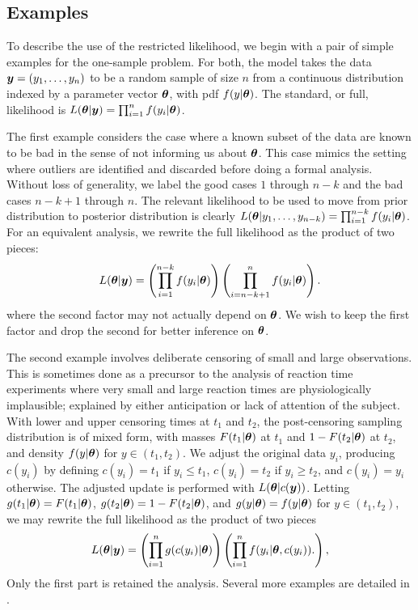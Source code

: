 \documentclass[ba]{imsart}
\def\bth{\mbox{\boldmath $\theta$}}
\newcommand{\by}{\mbox{\boldmath $y$}}
\begin{document}
\subsection{Examples}
To describe the use of the restricted likelihood, 
we begin with a pair of simple examples for the one-sample problem.  For both, the model takes the data $\by=(y_1,\ldots,y_n)$ to be a random sample
of size $n$ from a continuous distribution indexed by a parameter
vector $\bth$, with pdf $f(y| \bth)$.  The standard, or full,
likelihood is $L(\bth | \by) = \prod_{i=1}^n f(y_i | \bth)$.  

The first example considers the case where a known subset of the data are known to be 
bad in the sense of not informing us about $\bth$.  This case mimics the setting where outliers are identified and discarded before doing a formal analysis.  Without loss of generality, we label the good cases $1$ through $n-k$ and the bad cases $n-k+1$ through $n$.  The relevant likelihood to be used to move from prior distribution to posterior distribution is clearly $L(\bth | y_1, \ldots, y_{n-k}) = \prod_{i=1}^{n-k} f(y_i | \bth)$.  For an equivalent analysis, we rewrite the full likelihood as the product of two pieces:
\begin{eqnarray}
\label{OutlyingCases}
L(\bth | \by)  
= \left( \prod_{i=1}^{n-k} f(y_i | \bth) \right) \left( \prod_{i=n-k+1}^{n} f(y_i | \bth) \right) .  
\end{eqnarray}
where the second factor may not actually depend on $\bth$. We wish to keep the first factor and drop the second for better inference on $\bth$.

The second example involves deliberate censoring of small and large observations. This is
sometimes done as a precursor to the analysis of reaction time experiments  \citep[e.g.,][]{ratcliff1993} where very small and large reaction times are physiologically implausible;  explained by either anticipation or lack of attention of the subject.  
With lower and upper censoring times at $t_1$ and $t_2$, the post-censoring sampling distribution is of mixed form, with masses $F(t_1|\bth)$ at $t_1$ and $1-F(t_2|\bth)$ at $t_2$,
and density $f(y | \bth)$ for $y \in (t_1, t_2)$.  We adjust the original data $y_i$,
producing $c(y_i)$ by defining $c(y_i)= t_1$ if $y_i \leq t_1$, $c(y_i)=t_2$ 
if $y_i \geq t_2$, and $c(y_i)=y_i$ otherwise.  
The adjusted update is performed with $L(\bth |c(\by))$.  
Letting $g(t_1|\bth) = F(t_1|\bth)$,
$g(t_2 | \bth) = 1 - F(t_2|\bth)$, and $g(y|\bth)=f(y|\bth)$ for
$y \in (t_1, t_2)$, we may rewrite the full 
likelihood as the product of two pieces
\begin{eqnarray}
\label{Censoring} 
L(\bth | \by) =  \left( \prod_{i=1}^n g(c(y_i)  | \bth) \right) \left( \prod_{i=1}^n f(y_i|\bth,c(y_i)). \right) ,  
\end{eqnarray}
Only the first part is retained the analysis. Several more examples are detailed in \cite{lewis2014}.
\end{document}
